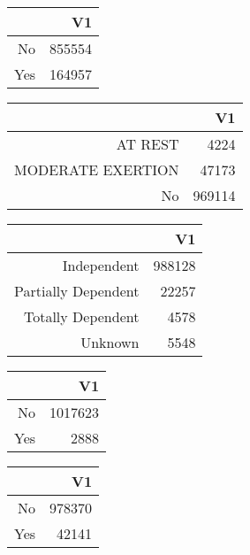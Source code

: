 \bigskip\bigskip
\centering
\begin{tabular}{rr}
  \hline
 & V1 \\ 
  \hline
No & 855554 \\ 
  Yes & 164957 \\ 
   \hline
\end{tabular}

\bigskip\bigskip
\centering
\begin{tabular}{rr}
  \hline
 & V1 \\ 
  \hline
AT REST & 4224 \\ 
  MODERATE EXERTION & 47173 \\ 
  No & 969114 \\ 
   \hline
\end{tabular}

\bigskip\bigskip
\centering
\begin{tabular}{rr}
  \hline
 & V1 \\ 
  \hline
Independent & 988128 \\ 
  Partially Dependent & 22257 \\ 
  Totally Dependent & 4578 \\ 
  Unknown & 5548 \\ 
   \hline
\end{tabular}

\bigskip\bigskip
\centering
\begin{tabular}{rr}
  \hline
 & V1 \\ 
  \hline
No & 1017623 \\ 
  Yes & 2888 \\ 
   \hline
\end{tabular}

\bigskip\bigskip
\centering
\begin{tabular}{rr}
  \hline
 & V1 \\ 
  \hline
No & 978370 \\ 
  Yes & 42141 \\ 
   \hline
\end{tabular}

